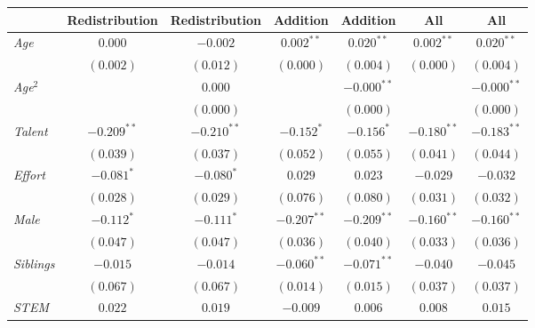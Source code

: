 
\begin{table}[H]
\begin{center}
\begin{footnotesize}
\begin{tabular}{l c c c c c c}
\toprule
 & Redistribution & Redistribution & Addition & Addition & All & All \\
\midrule
\textit{Age}                                  & $0.000$       & $-0.002$      & $0.002^{**}$  & $0.020^{**}$  & $0.002^{**}$  & $0.020^{**}$  \\
                                              & $(0.002)$     & $(0.012)$     & $(0.000)$     & $(0.004)$     & $(0.000)$     & $(0.004)$     \\
\textit{Age}$^2$                              &               & $0.000$       &               & $-0.000^{**}$ &               & $-0.000^{**}$ \\
                                              &               & $(0.000)$     &               & $(0.000)$     &               & $(0.000)$     \\
\textit{Talent}                               & $-0.209^{**}$ & $-0.210^{**}$ & $-0.152^{*}$  & $-0.156^{*}$  & $-0.180^{**}$ & $-0.183^{**}$ \\
                                              & $(0.039)$     & $(0.037)$     & $(0.052)$     & $(0.055)$     & $(0.041)$     & $(0.044)$     \\
\textit{Effort}                               & $-0.081^{*}$  & $-0.080^{*}$  & $0.029$       & $0.023$       & $-0.029$      & $-0.032$      \\
                                              & $(0.028)$     & $(0.029)$     & $(0.076)$     & $(0.080)$     & $(0.031)$     & $(0.032)$     \\
\textit{Male}                                 & $-0.112^{*}$  & $-0.111^{*}$  & $-0.207^{**}$ & $-0.209^{**}$ & $-0.160^{**}$ & $-0.160^{**}$ \\
                                              & $(0.047)$     & $(0.047)$     & $(0.036)$     & $(0.040)$     & $(0.033)$     & $(0.036)$     \\
\textit{Siblings}                             & $-0.015$      & $-0.014$      & $-0.060^{**}$ & $-0.071^{**}$ & $-0.040$      & $-0.045$      \\
                                              & $(0.067)$     & $(0.067)$     & $(0.014)$     & $(0.015)$     & $(0.037)$     & $(0.037)$     \\
\textit{STEM}                                 & $0.022$       & $0.019$       & $-0.009$      & $0.006$       & $0.008$       & $0.015$       \\

\end{tabular}
\end{footnotesize}
\end{center}
\end{table}
